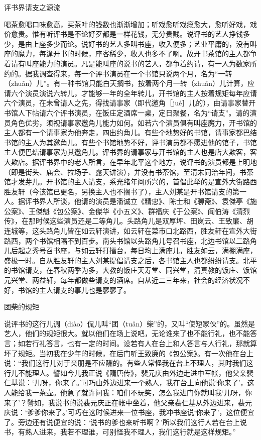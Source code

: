 \documentclass[12pt,UTF8]{ctexbook}
\begin{document}
评书界请支之源流


喝茶愈喝口味愈高，买茶叶的钱数也渐渐增加；听戏愈听戏瘾愈大，愈听好戏，戏价愈贵。惟有听评书是不论好歹都是一样花钱，无分贵贱。说评书的艺人挣钱多少，是由上座多少而论。说好书的艺人多叫书座，收入便多；艺业平庸的，没有叫座的魔力，每逢开书的时候，座客稀少，收入也多不了啊。故开书茶馆的主人都争着请有叫座能力的演员。凡是能叫座的说书的艺人，都争着约请，有一人为数家所约的。据我调查得来，每一个评书演员在一个书馆只说两个月，名为“一转（zhuǎn）儿”。有一种书馆只能白天搁书，按着两个月一转（zhuǎn）儿计算，应请六个演员演说六转儿，才能够一年的全年转儿，开书馆的主人按着规矩每年应请六个演员，在未曾请人之先，得找请事家（即代邀角［jué］儿的），由请事家替开书馆人下帖请六个评书演员，在饭庄定酒席一桌，定日聚餐，名为“请支”。请的演员角色优劣，须视请事家邀角儿能力如何。如若六个演员俱有叫座魔力，开书馆的主人都有一个请事家为他奔走，四出约角儿。有些个地势好的书馆，请事家都巴结书馆的主人为其邀角儿。有些个书馆地势不好，评书演员都不愿进他的馆子，书馆主人便巴结请事家为其邀角儿。评书界的请事家与开书馆的主人也是店大欺客，客大欺店。据评书界中的老人所言，在早年北平这个地方，说评书的演员都是上明地（即是街头、庙会、拉场子、露天讲演），并没有书茶馆，至清末同治年间，书茶馆才发芽儿。开书馆的主人请支，系光绪年间所兴的，首倡此举的是宣外大街路西胜友轩（今该馆已更名，另换主人也不搁书了），主人刘某是开书馆请支的第一人。据评书界人所谈，他请的演员是潘诚立《精忠》、陈士和《聊斋》、袁傑亭《施公案》、王傑魁《包公案》、金傑华《小五义》、群福庆《于公案》、阎伯涛《清烈传》，在那时候这些演员还是二等角儿。头路角儿是双厚坪、田岚云、王致廉、胡连城等，这头路角儿皆在如云轩演讲，如云轩在菜市口北路西，胜友轩在宣外大街路西，两个书馆相隔不到百步。南头书馆以头路角儿号召书座，北边书馆以二路角儿后起之秀号召书座，与如云轩打擂台，每日均上满座儿，胜友如云，满棚满座，盛极一时。自从胜友轩的主人刘某提倡请支之后，各书馆主人也都纷纷请支。北平的书馆请支，在春秋两季为多，大教的饭庄天寿堂、同兴堂，清真教的饭庄、饭馆元兴堂、两益轩，每年都做些请支的酒席。自从近二三年来，社会的经济状况不好，书馆的主人请支的事儿也是寥寥了。





团柴的规矩


说评书的这行儿调（diào）侃儿叫“团（tuǎn）柴”的，又叫“使短家伙”的。虽然是艺人，他们的规矩很大。就以他们在场上说吧，无论谁来了也不能行礼，也不能答言；如若行礼答言，也有一定的时间。设若有人在台上和人答言与人行礼，那就算坏了规矩。当初我在少年的时候，在后门听王致廉的《包公案》。有一次他在台上说：“我们这行儿对于亲朋是不应酬的。有些人常怪我在台上不理人，其时我们这行儿不能理人。譬如今儿我正说《隋唐传》，裴元庆由外边走进中军帐，他父亲裴仁基说：‘儿呀，你来了。’可巧由外边进来一个熟人，我在台上向他说‘你来了’，这人能给我一茶壶。他急了就许问我：咱们不玩笑，怎么我进门你就叫我‘儿呀，你来了’？譬如，我说书的说裴元庆正在帐中坐着，他父亲裴仁基从外边进来，裴元庆说：‘爹爹你来了。’可巧在这时候进来一位书座，我冲书座说‘你来了’，这位便宜了。旁边还有说便宜的说：‘说书的爹也来听书啊？’所以我们这行人若在台上说书，有熟人进来，我若不理谁，可别怪我不理人，我们这行就是这样规矩。”
\end{document}
